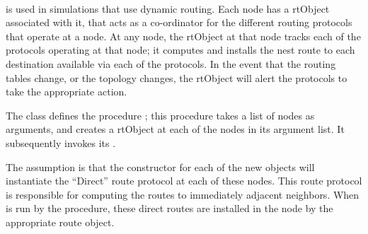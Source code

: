\paragraph{\protect{}}
is used in simulations that use dynamic routing.
Each node has a rtObject associated with it, that
acts as a co-ordinator for the different routing protocols that
operate at a node.
At any node, the rtObject at that node 
tracks each of the protocols operating at that node;
it computes and installs the nest route to each destination
available via each of the protocols.
In the event that the routing tables change, or the topology changes,
the rtObject will alert the protocols to take the appropriate action.

The class defines the procedure
;
this procedure takes a list of nodes as arguments,
and creates a rtObject at each of the nodes in its argument list.
It subsequently invokes its .

The assumption is that the constructor for each of the new objects
will instantiate the ``Direct'' route protocol at each of these nodes.
This route protocol is responsible for computing the routes to 
immediately adjacent neighbors.
When  is run by the  
procedure, these direct routes are installed in the node by the
appropriate route object.

